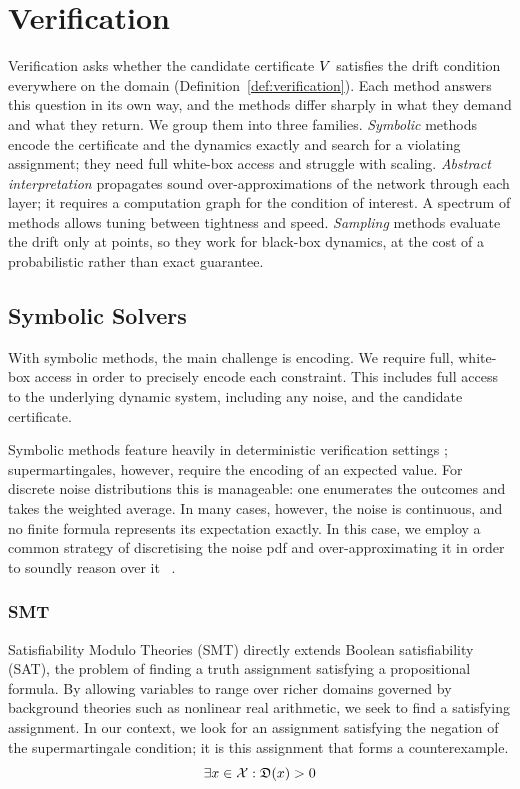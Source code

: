 \chapter{Verification}
\label{chap:verification}

Verification asks whether the candidate certificate
$V$ satisfies the drift condition everywhere on the domain
(Definition~\ref{def:verification}). Each method answers this question in its own way, and the methods differ sharply in what they demand and what they return.
We group them into three families. \emph{Symbolic} methods encode the
certificate and the dynamics exactly and search for a violating assignment; they
need full white-box access and struggle with scaling. 
\emph{Abstract interpretation} propagates sound over-approximations of the
network through each layer; it requires a computation graph for the condition of interest. A spectrum of methods allows tuning between tightness and speed. \emph{Sampling}
methods evaluate the drift only at points, so they work for black-box
dynamics, at the cost of a probabilistic rather than exact guarantee.

\section{Symbolic Solvers}

With symbolic methods, the main challenge is encoding. We require full, white-box access in order to precisely encode each constraint. This includes full access to the underlying dynamic system, including any noise, and the candidate certificate.

Symbolic methods feature heavily in deterministic verification settings
\cite{katz2017reluplex, abate2020lyapunov, peruffo2020barrier, abate2021fossil}; supermartingales, however, require the encoding of an expected value. For discrete noise distributions this is manageable: one enumerates the outcomes and takes the weighted average. In many cases, however, the noise is continuous, and no finite formula represents its expectation exactly. In this case, we employ a common strategy of discretising the noise pdf and over-approximating it in order to soundly reason over it
~\cite{lechner2022stability, zikelic2023reachavoid}.


\subsection{SMT}

Satisfiability Modulo Theories (SMT) directly extends Boolean satisfiability (SAT), the problem of finding a truth assignment satisfying a propositional formula. By allowing variables to range over richer domains governed by background theories such as nonlinear real arithmetic, we seek to find a satisfying assignment. In our context, we look for an assignment satisfying the negation of the supermartingale condition; it is this assignment that forms a counterexample.
\[
\exists x \in \mathcal{X} : \mathfrak{D}(x) > 0
\]

